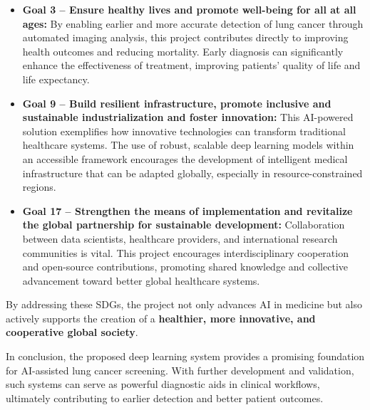 \begin{itemize}
    \item \textbf{Goal 3 – Ensure healthy lives and promote well-being for all at all ages:} By 
    enabling earlier and more accurate detection of lung cancer through automated imaging analysis, 
    this project contributes directly to improving health outcomes and reducing mortality. Early 
    diagnosis can significantly enhance the effectiveness of treatment, improving patients' quality 
    of life and life expectancy.
    
    \item \textbf{Goal 9 – Build resilient infrastructure, promote inclusive and sustainable 
    industrialization and foster innovation:} This AI-powered solution exemplifies how innovative 
    technologies can transform traditional healthcare systems. The use of robust, scalable deep 
    learning models within an accessible framework encourages the development of intelligent medical 
    infrastructure that can be adapted globally, especially in resource-constrained regions.
    
    \item \textbf{Goal 17 – Strengthen the means of implementation and revitalize the global 
    partnership for sustainable development:} Collaboration between data scientists, healthcare 
    providers, and international research communities is vital. This project encourages 
    interdisciplinary cooperation and open-source contributions, promoting shared knowledge and 
    collective advancement toward better global healthcare systems.
\end{itemize}

By addressing these SDGs, the project not only advances AI in medicine but also actively supports 
the creation of a \textbf{healthier, more innovative, and cooperative global society}.

In conclusion, the proposed deep learning system provides a promising foundation for AI-assisted 
lung cancer screening. With further development and validation, such systems can serve as powerful 
diagnostic aids in clinical workflows, ultimately contributing to earlier detection and better 
patient outcomes.
